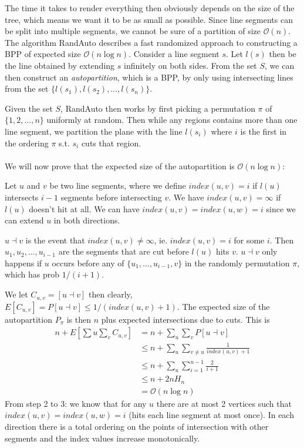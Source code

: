 \documentclass[a4paper]{article}
\begin{document}
The time it takes to render everything then obviously depends on the size of the tree, which means we want it to be as small as possible. Since line segments can be split into multiple segments, we cannot be sure of a partition of size $\mathcal{O}(n)$.\\

The algorithm RandAuto describes a fast randomized approach to constructing a BPP of expected size $\mathcal{O}(n\log n)$. Consider a line segment $s$. Let $l(s)$ then be the line obtained by extending $s$ infinitely on both sides. From the set $S$, we can then construct an \textit{autopartition}, which is a BPP, by only using intersecting lines from the set $\{l(s_1), l(s_2),\ldots,l(s_n)\}$.

Given the set $S$, RandAuto then works by first picking a permutation $\pi$ of $\{1,2,\ldots,n\}$ uniformly at random. Then while any regions contains more than one line segment, we partition the plane with the line $l(s_i)$ where $i$ is the first in the ordering $\pi$ s.t. $s_i$ cuts that region.\\
\\
We will now prove that the expected size of the autopartition is $\mathcal{O}(n\log n)$:

Let $u$ and $v$ be two line segments, where we define $index(u,v)=i$ if $l(u)$ intersects $i-1$ segments before intersecting $v$. We have $index(u,v)=\infty$ if $l(u)$ doesn't hit at all. We can have $index(u,v)=index(u,w)=i$ since we can extend $u$ in both directions.

$u \dashv v$ is the event that $index(u,v)\not = \infty$, ie. $index(u,v)=i$ for some $i$. Then $u_1,u_2,\ldots,u_{i-1}$ are the segments that are cut before $l(u)$ hits $v$. $u \dashv v$ only happens if $u$ occurs before any of $\{u_1,\ldots,u_{i-1},v\}$ in the randomly permutation $\pi$, which has prob $1/(i+1)$.

We let $C_{u,v}=[u\dashv v]$ then clearly, $E[C_{u,v}]=P[u\dashv v]\leq 1/(index(u,v)+1)$. The expected size of the autopartition $P_{\pi}$ is then $n$ plus expected intersections due to cuts. This is 
\begin{align*}
  n+E\left[\sum{u}\sum_{v}  C_{u,v} \right] &=    n+\sum_{u}\sum_{v} P\left[ u \dashv v \right]\\
                                            &\leq n+\sum_{u}\sum_{v\not = u}\frac{1}{index(u,v)+1}\\
                                            &\leq n+\sum_{u}\sum_{i=1}^{n-1}\frac{2}{i+1}\\
                                            &\leq n+2nH_n\\
                                            &=    \mathcal{O}(n\log n)
\end{align*}
From step 2 to 3: we know that for any $u$ there are at most 2 vertices such that $index(u,v)=index(u,w)=i$ (hits each line segment at most once). In each direction there is a total ordering on the points of intersection with other segments and the index values increase monotonically.
\end{document}
